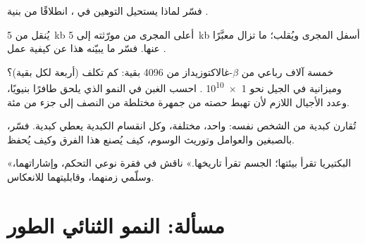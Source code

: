 \begin{exercise}[$\star\star$]\label{exo:b1:expression-control:8}
فسّر لماذا يستحيل التوهين في ، انطلاقًا من بنية
.
\end{exercise}

\begin{exercise}[$\star\star$]\label{exo:b1:expression-control:9}
 يُنقل من \qty{5}{kb} أعلى المجرى من مورّثته إلى \qty{5}{kb}
أسفل المجرى ويُقلب؛  ما تزال معبَّرًا عنها. فسّر ما يبيّنه
هذا عن كيفية عمل .
\end{exercise}

\begin{exercise}[$\star\star\star$]\label{exo:b1:expression-control:10}
خمسة آلاف رباعي من $\beta$-غالاكتوزيداز من \qty{4096}{} بقية: كم
 تكلف (أربعة لكل بقية)؟ وميزانية  في الجيل نحو
\qty{1e10}{} . احسب الغبن في النمو الذي يلحق طافرًا بنيويًا،
وعدد الأجيال اللازم لأن تهبط حصته من جمهرة مختلطة من النصف إلى
جزء من مئة.
\end{exercise}

\begin{exercise}[$\star\star\star$]\label{exo:b1:expression-control:11}
تُقارن  كبدية  من الشخص نفسه:  واحد،
 مختلفة، وكل انقسام  الكبدية يعطي  كبدية.
فسّر، بالصبغين والعوامل وتوريث الوسوم، كيف يُصنع هذا الفرق وكيف
يُحفظ.
\end{exercise}

\begin{exercise}[$\star\star\star$]\label{exo:b1:expression-control:12}
«البكتيريا تقرأ بيئتها؛  الجسم تقرأ تاريخها.» ناقش في فقرة
نوعي التحكم، وإشاراتهما، وسلّمي زمنهما، وقابليتهما للانعكاس.
\end{exercise}

\section{مسألة: النمو الثنائي الطور}

